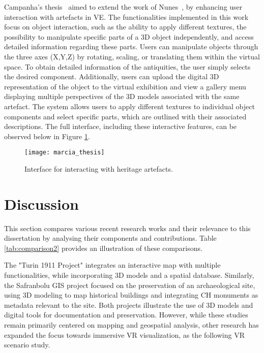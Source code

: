 Campanha's thesis~\cite{campanha2024heritage} aimed to extend the work of Nunes~\cite{nunes_thesis}, by enhancing user interaction with 
artefacts in \gls{VE}. The functionalities implemented in this work focus on object interaction, such as the ability to apply different textures, the possibility to manipulate specific parts of a \gls{3D} object independently, and access detailed information regarding these parts.
Users can manipulate objects through the three axes (X,Y,Z) by rotating, scaling, or translating them within the virtual space.
To obtain detailed information of the antiquities, the user simply selects the desired component.
Additionally, users can upload the digital \gls{3D} representation of the object to the virtual exhibition and view a gallery menu displaying multiple perspectives of the \gls{3D} models associated with the same artefact.
The system allows users to apply different textures to individual object components and select specific parts, which are outlined with their associated descriptions.
The full interface, including these interactive features, can be observed below in Figure \ref{fig:marcia_image}.

\begin{figure}[h!]
  \centering
  \texttt{[image: marcia\_thesis]}
  \caption{Interface for interacting with heritage artefacts.}
  \label{fig:marcia_image}
\end{figure}
\FloatBarrier

\section{Discussion}
\label{sec:discussion}

This section compares various recent research works and their relevance to this dissertation by analysing their components and contributions. Table \ref{tab:comparison2} provides an illustration of these comparisons.

The "Turin 1911 Project" integrates an interactive map with multiple functionalities, while incorporating \gls{3D} models and a spatial database. Similarly, the Safranbolu \gls{GIS} project focused on the preservation of an archaeological site, using \gls{3D} modeling to map historical buildings and integrating \gls{CH} monuments as metadata relevant to the site. Both projects illustrate the use of \gls{3D} models and digital tools for documentation and preservation. 
However, while these studies remain primarily centered on mapping and geospatial analysis, other research has expanded the focus towards immersive \gls{VR} visualization, as the following \gls{VR} scenario study.

